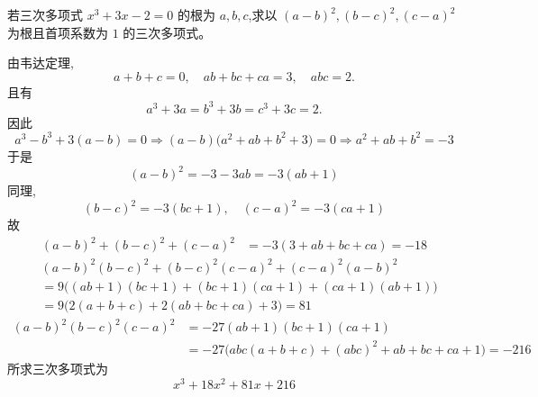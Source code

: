 \begin{questions}
    \question 若三次多项式 $x^{3}+3x-2=0$ 的根为 $a,b,c$,求以 $(a-b)^{2},(b-c)^{2},(c-a)^{2}$ 为根且首项系数为 $1$ 的三次多项式。
    \begin{solution}
        由韦达定理,
        \[
        a+b+c=0,\quad ab+bc+ca=3,\quad abc=2.
        \]
        且有
        \[
        a^3+3a=b^3+3b=c^3+3c=2.
        \]
        因此
        \[
        a^3-b^3+3(a-b)=0\Rightarrow (a-b)\bigl(a^2+ab+b^2+3\bigr)=0\Rightarrow a^2+ab+b^2=-3
        \]
        于是
        \[
        (a-b)^2=-3-3ab=-3(ab+1)
        \]
        同理,
        \[
        (b-c)^2=-3(bc+1),\quad (c-a)^2=-3(ca+1)
        \]
        故
        \begin{align*}
        (a-b)^2+(b-c)^2+(c-a)^2 
        &= -3(3+ab+bc+ca) = -18
        \end{align*}
        \begin{align*}
        &(a-b)^2(b-c)^2+(b-c)^2(c-a)^2+(c-a)^2(a-b)^2 \\
        &= 9\big((ab+1)(bc+1)+(bc+1)(ca+1)+(ca+1)(ab+1)\big) \\
        &= 9\big(2(a+b+c)+2(ab+bc+ca)+3\big) = 81
        \end{align*}
        \begin{align*}
        (a-b)^2(b-c)^2(c-a)^2
        &= -27(ab+1)(bc+1)(ca+1) \\
        &= -27\big(abc(a+b+c)+(abc)^2+ab+bc+ca+1\big) = -216
        \end{align*}
        所求三次多项式为
        \[
        x^3 +18x^2 +81x +216
        \]
    \end{solution}


\end{questions}
